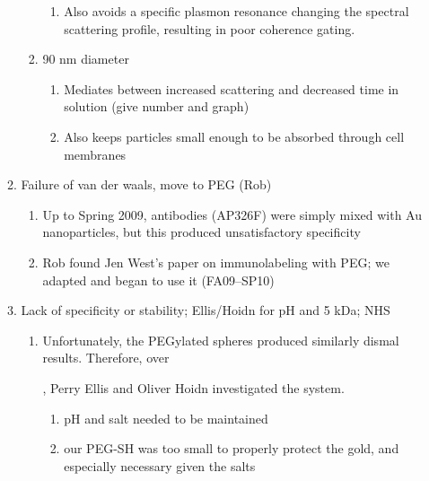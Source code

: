 \begin{enumerate}
\begin{enumerate}
\begin{enumerate}
\begin{enumerate}
\item Also avoids a specific plasmon resonance changing the spectral scattering profile, resulting in poor coherence gating.

\end{enumerate}

\item 90 nm diameter

\begin{enumerate}
\item Mediates between increased scattering and decreased time in solution (give number and graph)

\item Also keeps particles small enough to be absorbed through cell membranes

\end{enumerate}

\end{enumerate}

\item Failure of van der waals, move to PEG (Rob)

\begin{enumerate}
\item Up to Spring 2009, antibodies (AP326F) were simply mixed with Au nanoparticles, but this produced unsatisfactory specificity

\item Rob found Jen West's paper on immunolabeling with PEG; we adapted and began to use it (FA09--SP10)

\end{enumerate}

\item Lack of specificity or stability; Ellis\slash Hoidn for pH and 5 kDa; NHS

\begin{enumerate}
\item Unfortunately, the PEGylated spheres produced similarly dismal results. Therefore, over \begin{summer 2010}
	
\end{summer 2010}, Perry Ellis and Oliver Hoidn investigated the system.

\begin{enumerate}
\item pH and salt needed to be maintained

\item our PEG-SH was too small to properly protect the gold, and especially necessary given the salts


\end{enumerate}
\end{enumerate}
\end{enumerate}
\end{enumerate}
